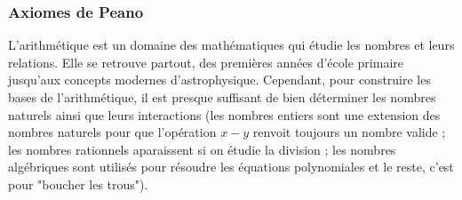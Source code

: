 \documentclass[12pt, a4paper]{article}
\begin{document}
%


\subsubsection*{Axiomes de Peano}
L'arithmétique est un domaine des mathématiques qui étudie les nombres et leurs relations.
Elle se retrouve partout, des premières années d'école primaire jusqu'aux concepts modernes d'astrophysique.
Cependant, pour construire les bases de l'arithmétique, il est presque suffisant de bien déterminer les nombres naturels ainsi que leurs interactions
(les nombres entiers sont une extension des nombres naturels pour que l'opération $x - y$ renvoit toujours un nombre valide ; les nombres rationnels aparaissent si on étudie la division ; les nombres algébriques sont utilisés pour résoudre les équations polynomiales et le reste, c'est pour "boucher les trous").
\end{document}

